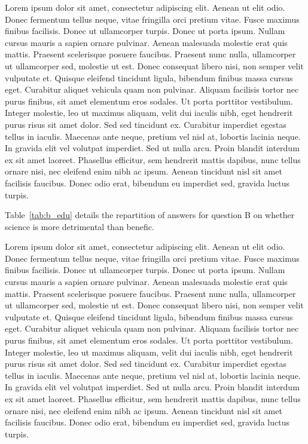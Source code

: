 \documentclass[utf8]{frontiersSCNS}
\begin{document}
Lorem ipsum dolor sit amet, consectetur adipiscing elit. Aenean ut elit
odio. Donec fermentum tellus neque, vitae fringilla orci pretium vitae.
Fusce maximus finibus facilisis. Donec ut ullamcorper turpis. Donec ut
porta ipsum. Nullam cursus mauris a sapien ornare pulvinar. Aenean
malesuada molestie erat quis mattis. Praesent scelerisque posuere
faucibus. Praesent nunc nulla, ullamcorper ut ullamcorper sed, molestie
ut est. Donec consequat libero nisi, non semper velit vulputate et.
Quisque eleifend tincidunt ligula, bibendum finibus massa cursus eget.
Curabitur aliquet vehicula quam non pulvinar. Aliquam facilisis tortor
nec purus finibus, sit amet elementum eros sodales. Ut porta porttitor
vestibulum. Integer molestie, leo ut maximus aliquam, velit dui iaculis
nibh, eget hendrerit purus risus sit amet dolor. Sed sed tincidunt ex.
Curabitur imperdiet egestas tellus in iaculis. Maecenas ante neque,
pretium vel nisl at, lobortis lacinia neque. In gravida elit vel
volutpat imperdiet. Sed ut nulla arcu. Proin blandit interdum ex sit
amet laoreet. Phasellus efficitur, sem hendrerit mattis dapibus, nunc
tellus ornare nisi, nec eleifend enim nibh ac ipsum. Aenean tincidunt
nisl sit amet facilisis faucibus. Donec odio erat, bibendum eu imperdiet
sed, gravida luctus turpis.

Table~\ref{tab:b_edu} details the repartition of answers for question B
on whether science is more detrimental than benefic.

Lorem ipsum dolor sit amet, consectetur adipiscing elit. Aenean ut elit
odio. Donec fermentum tellus neque, vitae fringilla orci pretium vitae.
Fusce maximus finibus facilisis. Donec ut ullamcorper turpis. Donec ut
porta ipsum. Nullam cursus mauris a sapien ornare pulvinar. Aenean
malesuada molestie erat quis mattis. Praesent scelerisque posuere
faucibus. Praesent nunc nulla, ullamcorper ut ullamcorper sed, molestie
ut est. Donec consequat libero nisi, non semper velit vulputate et.
Quisque eleifend tincidunt ligula, bibendum finibus massa cursus eget.
Curabitur aliquet vehicula quam non pulvinar. Aliquam facilisis tortor
nec purus finibus, sit amet elementum eros sodales. Ut porta porttitor
vestibulum. Integer molestie, leo ut maximus aliquam, velit dui iaculis
nibh, eget hendrerit purus risus sit amet dolor. Sed sed tincidunt ex.
Curabitur imperdiet egestas tellus in iaculis. Maecenas ante neque,
pretium vel nisl at, lobortis lacinia neque. In gravida elit vel
volutpat imperdiet. Sed ut nulla arcu. Proin blandit interdum ex sit
amet laoreet. Phasellus efficitur, sem hendrerit mattis dapibus, nunc
tellus ornare nisi, nec eleifend enim nibh ac ipsum. Aenean tincidunt
nisl sit amet facilisis faucibus. Donec odio erat, bibendum eu imperdiet
sed, gravida luctus turpis.
\end{document}
